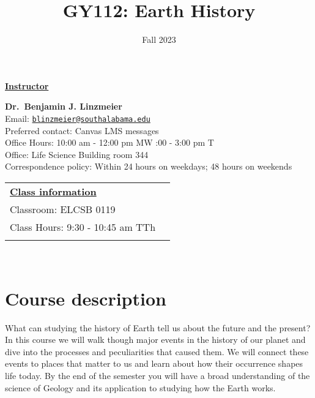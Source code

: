 \documentclass[11pt,]{article}
\title{GY112: Earth History}
\date{Fall 2023}
\begin{document}
  

		\maketitle
		
	
		\thispagestyle{firststyle}

\textbf{\underline{Instructor}}
\begin{multicols}{2}

  \textbf{Dr.~Benjamin J. Linzmeier}\\
  Email: \href{mailto:blinzmeier@southalabama.edu}{\nolinkurl{blinzmeier@southalabama.edu}}\\
  Preferred contact: Canvas LMS messages\\
  Office Hours: 10:00 am - 12:00 pm MW :00 - 3:00 pm T\\
  Office: Life Science Building room 344\\
  Correspondence policy: Within 24 hours on weekdays; 48 hours on
weekends\\
    \columnbreak
    
  \end{multicols}
	
\noindent \begin{tabular*}{\textwidth}{ @{\extracolsep{\fill}} lr @{\extracolsep{\fill}}}
\textbf{\underline{Class information}}\\
  Classroom: ELCSB 0119\\
  Class Hours: 9:30 - 10:45 am TTh\\
    \\
	\end{tabular*}\\


\vspace{2mm}


\hypertarget{course-description}{%
\section{Course description}\label{course-description}}

What can studying the history of Earth tell us about the future and the
present? In this course we will walk though major events in the history
of our planet and dive into the processes and peculiarities that caused
them. We will connect these events to places that matter to us and learn
about how their occurrence shapes life today. By the end of the semester
you will have a broad understanding of the science of Geology and its
application to studying how the Earth works.
\end{document}
